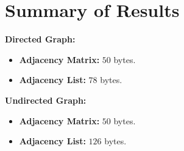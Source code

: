 \documentclass[11pt]{article}
\begin{document}
\section*{Summary of Results}

\textbf{Directed Graph:}
\begin{itemize}
    \item \textbf{Adjacency Matrix:} \(50\) bytes.
    \item \textbf{Adjacency List:} \(78\) bytes.
\end{itemize}

\textbf{Undirected Graph:}
\begin{itemize}
    \item \textbf{Adjacency Matrix:} \(50\) bytes.
    \item \textbf{Adjacency List:} \(126\) bytes.
\end{itemize}
\end{document}
